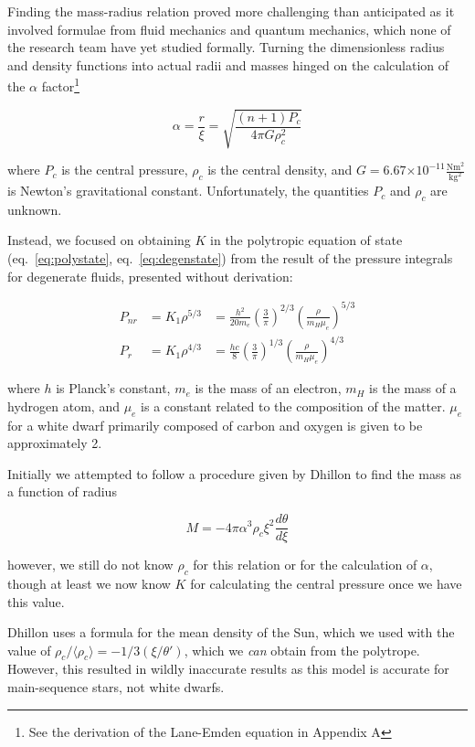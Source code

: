 \documentclass[twoside]{article}
\providecommand{\e}[1]{\ensuremath{\times 10^{#1}}}
\begin{document}
\begin{multicols}{2}
Finding the mass-radius relation proved more challenging than anticipated as it
involved formulae from fluid mechanics and quantum mechanics, which none of the
research team have yet studied formally. Turning the dimensionless radius and
density functions into actual radii and masses hinged on the calculation of the
\(\alpha\) factor\footnote{See the derivation of the Lane-Emden equation in
Appendix A}

\begin{equation}
    \alpha = \frac{r}{\xi} = \sqrt{\frac{(n+1)P_c}{4\pi G\rho_c^2}}
\end{equation}

where \(P_c\) is the central pressure, \(\rho_c\) is the central density, and
\(G=6.67\e{-11}\frac{\mathrm{Nm^2}}{\mathrm{kg^2}}\) is Newton's gravitational
constant. Unfortunately, the quantities \(P_c\) and \(\rho_c\) are unknown.

Instead, we focused on obtaining \(K\) in the polytropic equation of state
(eq.~\ref{eq:polystate}, eq.~\ref{eq:degenstate}) from the result of the
pressure integrals for degenerate fluids, presented without derivation:

\begin{align}
    P_{nr} &= K_1\rho^{5/3} &=
    \frac{h^2}{20m_e}\left(\frac{3}{\pi}\right)^{2/3}\left(\frac{\rho}{m_H\mu_e}\right)^{5/3}
    \\
    P_r &= K_1\rho^{4/3} &=
    \frac{hc}{8}\left(\frac{3}{\pi}\right)^{1/3}\left(\frac{\rho}{m_H\mu_e}\right)^{4/3}
\end{align}

where \(h\) is Planck's constant, \(m_e\) is the mass of an electron, \(m_H\) is
the mass of a hydrogen atom, and \(\mu_e\) is a constant related to the
composition of the matter. \(\mu_e\) for a white dwarf primarily composed of
carbon and oxygen is given to be approximately 2.

Initially we attempted to follow a procedure given by
Dhillon\cite{website:dhillon} to find the mass as a function of radius

\begin{equation}
    M = -4\pi\alpha^3\rho_c\xi^2\frac{d\theta}{d\xi}
\end{equation}

however, we still do not know \(\rho_c\) for this relation or for the calculation
of \(\alpha\), though at least we now know \(K\) for calculating the central
pressure once we have this value.

Dhillon uses a formula for the mean density of the Sun, which we used with the
value of \(\rho_c/\langle \rho_c \rangle = -1/3 (\xi/\theta') \), which we \emph{can} obtain from the
polytrope. However, this resulted in wildly inaccurate results as this model
is accurate for main-sequence stars, not white dwarfs.


\end{multicols}
\end{document}
